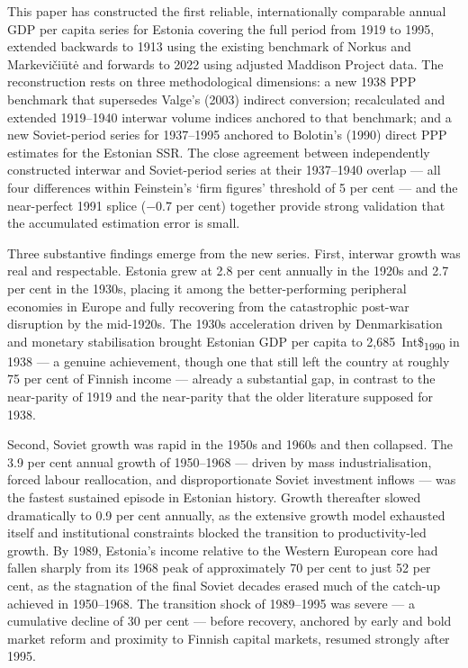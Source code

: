 \documentclass[12pt,a4paper]{article}
\newcommand{\intlnineteen}{Int\$\textsubscript{1990}}   %
\begin{document}
%

This paper has constructed the first reliable, internationally comparable annual GDP per capita series for Estonia covering the full period from 1919 to 1995, extended backwards to 1913 using the existing benchmark of Norkus and Markevičiūtė and forwards to 2022 using adjusted Maddison Project data. The reconstruction rests on three methodological dimensions: a new 1938 PPP benchmark that supersedes Valge's (2003) indirect conversion; recalculated and extended 1919--1940 interwar volume indices anchored to that benchmark; and a new Soviet-period series for 1937--1995 anchored to Bolotin's (1990) direct PPP estimates for the Estonian SSR. The close agreement between independently constructed interwar and Soviet-period series at their 1937--1940 overlap — all four differences within Feinstein's `firm figures' threshold of 5 per cent — and the near-perfect 1991 splice ($-$0.7 per cent) together provide strong validation that the accumulated estimation error is small.

Three substantive findings emerge from the new series. First, interwar growth was real and respectable. Estonia grew at 2.8 per cent annually in the 1920s and 2.7 per cent in the 1930s, placing it among the better-performing peripheral economies in Europe and fully recovering from the catastrophic post-war disruption by the mid-1920s. The 1930s acceleration driven by Denmarkisation and monetary stabilisation brought Estonian GDP per capita to 2,685~\intlnineteen{} in 1938 — a genuine achievement, though one that still left the country at roughly 75 per cent of Finnish income — already a substantial gap, in contrast to the near-parity of 1919 and the near-parity that the older literature supposed for 1938.

Second, Soviet growth was rapid in the 1950s and 1960s and then collapsed. The 3.9 per cent annual growth of 1950--1968 — driven by mass industrialisation, forced labour reallocation, and disproportionate Soviet investment inflows — was the fastest sustained episode in Estonian history. Growth thereafter slowed dramatically to 0.9 per cent annually, as the extensive growth model exhausted itself and institutional constraints blocked the transition to productivity-led growth. By 1989, Estonia's income relative to the Western European core had fallen sharply from its 1968 peak of approximately 70 per cent to just 52 per cent, as the stagnation of the final Soviet decades erased much of the catch-up achieved in 1950--1968. The transition shock of 1989--1995 was severe — a cumulative decline of 30 per cent — before recovery, anchored by early and bold market reform and proximity to Finnish capital markets, resumed strongly after 1995.
\end{document}
